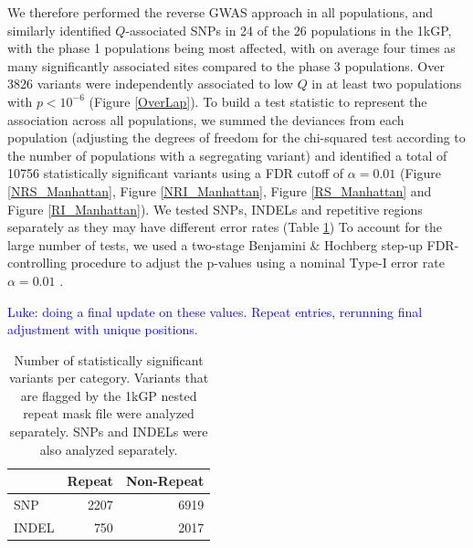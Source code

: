 \documentclass[9pt,lineno]{elife}
\newcommand{\sgcomment}[1]{\textcolor{blue}{SG: #1}}
\newcommand{\luke}[1]{\textcolor{blue}{Luke: #1}}
\begin{document}
We therefore performed the reverse GWAS approach in all populations, and similarly identified $Q$-associated SNPs in 24 of the 26 populations in the 1kGP, with the phase 1 populations being most affected, with on average four times as many significantly associated sites compared to the phase 3 populations.
Over 3826 variants were independently associated to low $Q$ in at least two populations with $ p < 10^{-6}$ (Figure \ref{OverLap}). 
To build a test statistic to represent the association across all populations, we summed the deviances from each population (adjusting the degrees of freedom for the chi-squared test according to the number of populations with a segregating variant) and identified a total of 10756 statistically significant variants using a FDR cutoff of $\alpha = 0.01$ (Figure \ref{NRS_Manhattan}, Figure \ref{NRI_Manhattan}, Figure \ref{RS_Manhattan} and Figure \ref{RI_Manhattan}).
We tested SNPs, INDELs and repetitive regions separately as they may have different error rates (Table \ref{sigTable})
To account for the large number of tests, we used a two-stage Benjamini \& Hochberg step-up FDR-controlling procedure to adjust the p-values using a nominal Type-I error rate $\alpha = 0.01$ \citep{Benjamini2006}. 

\luke{doing a final update on these values. Repeat entries, rerunning final adjustment with unique positions.}
\begin{table}[h]
\begin{tabular}{l  r r}
                      & {Repeat}  & {Non-Repeat}       \\ \hline
{SNP}  & 2207 & 6919 \\  
{INDEL} & 750  & 2017 \\ \hline
\end{tabular}
\caption{Number of statistically significant variants per category. Variants that are flagged by the 1kGP nested repeat mask file were analyzed separately. SNPs and INDELs were also analyzed separately.}
\label{sigTable}
\end{table}
\end{document}
